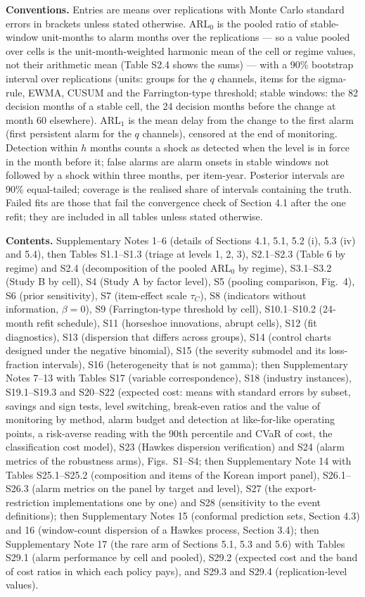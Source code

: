 \documentclass[10pt,a4paper]{article}
\begin{document}
\textbf{Conventions.} Entries are means over replications with Monte Carlo standard errors in brackets unless stated otherwise. ARL$_0$ is the pooled ratio of stable-window unit-months to alarm months over the replications --- so a value pooled over cells is the unit-month-weighted harmonic mean of the cell or regime values, not their arithmetic mean (Table S2.4 shows the sums) --- with a 90\% bootstrap interval over replications (units: groups for the $q$ channels, items for the sigma-rule, EWMA, CUSUM and the Farrington-type threshold; stable windows: the 82 decision months of a stable cell, the 24 decision months before the change at month 60 elsewhere). ARL$_1$ is the mean delay from the change to the first alarm (first persistent alarm for the $q$ channels), censored at the end of monitoring. Detection within $h$ months counts a shock as detected when the level is in force in the month before it; false alarms are alarm onsets in stable windows not followed by a shock within three months, per item-year. Posterior intervals are 90\% equal-tailed; coverage is the realised share of intervals containing the truth. Failed fits are those that fail the convergence check of Section 4.1 after the one refit; they are included in all tables unless stated otherwise.

\textbf{Contents.} Supplementary Notes 1--6 (details of Sections 4.1, 5.1, 5.2 (i), 5.3 (iv) and 5.4), then Tables S1.1--S1.3 (triage at levels 1, 2, 3), S2.1--S2.3 (Table 6 by regime) and S2.4 (decomposition of the pooled ARL$_0$ by regime), S3.1--S3.2 (Study B by cell), S4 (Study A by factor level), S5 (pooling comparison, Fig.~4), S6 (prior sensitivity), S7 (item-effect scale $\tau_C$), S8 (indicators without information, $\beta = 0$), S9 (Farrington-type threshold by cell), S10.1--S10.2 (24-month refit schedule), S11 (horseshoe innovations, abrupt cells), S12 (fit diagnostics), S13 (dispersion that differs across groups), S14 (control charts designed under the negative binomial), S15 (the severity submodel and its loss-fraction intervals), S16 (heterogeneity that is not gamma); then Supplementary Notes 7--13 with Tables S17 (variable correspondence), S18 (industry instances), S19.1--S19.3 and S20--S22 (expected cost: means with standard errors by subset, savings and sign tests, level switching, break-even ratios and the value of monitoring by method, alarm budget and detection at like-for-like operating points, a risk-averse reading with the 90th percentile and CVaR of cost, the classification cost model), S23 (Hawkes dispersion verification) and S24 (alarm metrics of the robustness arms), Figs.~S1--S4; then Supplementary Note 14 with Tables S25.1--S25.2 (composition and items of the Korean import panel), S26.1--S26.3 (alarm metrics on the panel by target and level), S27 (the export-restriction implementations one by one) and S28 (sensitivity to the event definitions); then Supplementary Notes 15 (conformal prediction sets, Section 4.3) and 16 (window-count dispersion of a Hawkes process, Section 3.4); then Supplementary Note 17 (the rare arm of Sections 5.1, 5.3 and 5.6) with Tables S29.1 (alarm performance by cell and pooled), S29.2 (expected cost and the band of cost ratios in which each policy pays), and S29.3 and S29.4 (replication-level values).
\end{document}
